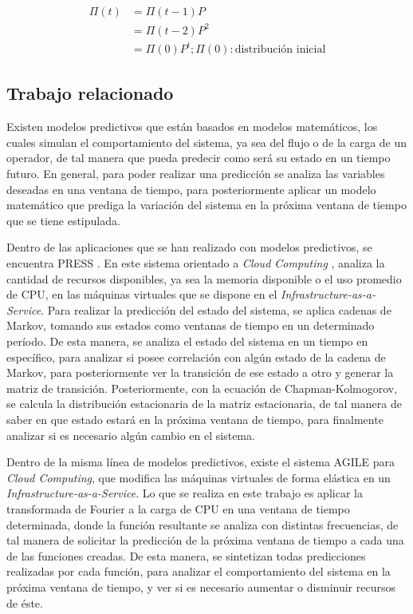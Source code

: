 \begin{equation} \label{eq:chapman-kolgorov3}
\begin{split}
	\Pi (t) &= \Pi (t-1)P \\
				  &= \Pi (t-2)P^{2}\\
				  &= \Pi (0)P^{t} ; \Pi (0): \text{distribución inicial}
\end{split}
\end{equation}

\subsection{Trabajo relacionado}
\label{subSec:markovTrabajo}
Existen modelos predictivos que están basados en modelos matemáticos, los cuales simulan el comportamiento del sistema, ya sea del flujo o de la carga de un operador, de tal manera que pueda predecir como será su estado en un tiempo futuro. En general, para poder realizar una predicción se analiza las variables deseadas en una ventana de tiempo, para posteriormente aplicar un modelo matemático que prediga la variación del sistema en la próxima ventana de tiempo que se tiene estipulada.

Dentro de las aplicaciones que se han realizado con modelos predictivos, se encuentra PRESS \citep{GongGW10}. En este sistema orientado a \textit{Cloud Computing} \citep{bookDistrSys}, analiza la cantidad de recursos disponibles, ya sea la memoria disponible o el uso promedio de CPU, en las máquinas virtuales que se dispone en el \textit{Infrastructure-as-a-Service}. Para realizar la predicción del estado del sistema, se aplica cadenas de Markov, tomando sus estados como ventanas de tiempo en un determinado período. De esta manera, se analiza el estado del sistema en un tiempo en específico, para analizar si posee correlación con algún estado de la cadena de Markov, para posteriormente ver la transición de ese estado a otro y generar la matriz de transición. Posteriormente, con la ecuación de Chapman-Kolmogorov, se calcula la distribución estacionaria de la matriz estacionaria, de tal manera de saber en que estado estará en la próxima ventana de tiempo, para finalmente analizar si es necesario algún cambio en el sistema.

Dentro de la misma línea de modelos predictivos, existe el sistema AGILE \citep{NguyenSGSW13} para \textit{Cloud Computing}, que modifica las máquinas virtuales de forma elástica en un \textit{Infrastructure-as-a-Service}. Lo que se realiza en este trabajo es aplicar la transformada de Fourier \citep{falk2012first} a la carga de CPU en una ventana de tiempo determinada, donde la función resultante se analiza con distintas frecuencias, de tal manera de solicitar la predicción de la próxima ventana de tiempo a cada una de las funciones creadas. De esta manera, se sintetizan todas predicciones realizadas por cada función, para analizar el comportamiento del sistema en la próxima ventana de tiempo, y ver si es necesario aumentar o disminuir recursos de éste.

